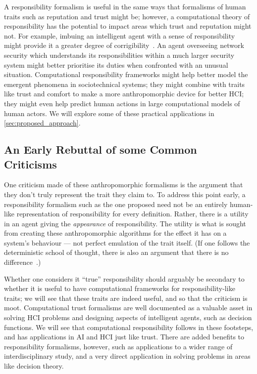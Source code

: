 A responsibility formalism is useful in the same ways that formalisms of human traits such as reputation and trust might be; however, a computational theory of responsibility has the potential to impact areas which trust and reputation might not. For example, imbuing an intelligent agent with a sense of responsibility might provide it a greater degree of corrigibility~\cite{corrigibility}. An agent overseeing network security which understands its responsibilities within a much larger security system might better prioritise its duties when confronted with an unusual situation. Computational responsibility frameworks might help better model the emergent phenomena in sociotechnical systems; they might combine with traits like trust and comfort to make a more anthropomorphic device for better HCI\@; they might even help predict human actions in large computational models of human actors. We will explore some of these practical applications in \cref{sec:proposed_approach}.\par

\subsection{An Early Rebuttal of some Common Criticisms}
One criticism made of these anthropomorphic formalisms is the argument that they don't truly represent the trait they claim to. To address this point early, a responsibility formalism such as the one proposed need not be an entirely human-like representation of responsibility for every definition. Rather, there is a utility in an agent giving the \emph{appearance} of responsibility. The utility is what is sought from creating these anthropomorphic algorithms for the effect it has on a system's behaviour --- not perfect emulation of the trait itself. (If one follows the deterministic school of thought, there is also an argument that there is no difference~\cite{determinism_in_brief}.) \par

Whether one considers it ``true'' responsibility should arguably be secondary to whether it is useful to have computational frameworks for responsibility-like traits; we will see that these traits are indeed useful, and so that the criticism is moot. Computational trust formalisms are well documented as a valuable asset in solving HCI problems and designing aspects of intelligent agents, such as decision functions. We will see that computational responsibility follows in these footsteps, and has applications in AI and HCI just like trust. There are added benefits to responsibility formalisms, however, such as applications to a wider range of interdisciplinary study, and a very direct application in solving problems in areas like decision theory.\par

